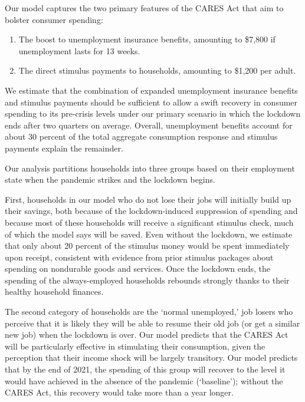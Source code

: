 \documentclass[titlepage,a4paper]{\econtex}
\begin{document}
Our model captures the two primary features of the CARES Act that aim to bolster consumer spending:
\begin{enumerate}
\item The boost to unemployment insurance benefits, amounting to \$7,800 if unemployment lasts for 13 weeks.
\item The direct stimulus payments to households, amounting to \$1,200 per adult.
\end{enumerate}

We estimate that the combination of expanded unemployment insurance benefits and stimulus payments should be sufficient to allow a swift recovery in consumer spending to its pre-crisis levels under our primary scenario in which the lockdown ends after two quarters on average.
Overall, unemployment benefits account for about 30 percent of the total aggregate consumption response and stimulus payments explain the remainder.

Our analysis partitions households into three groups based on their employment state when the pandemic strikes and the lockdown begins.

First, households in our model who do not lose their jobs will initially build up their savings, both because of the lockdown-induced suppression of spending and because most of these households will receive a significant stimulus check, much of which the model says will be saved.
Even without the lockdown, we estimate that only about 20 percent of the stimulus money would be spent immediately upon receipt, consistent with evidence from prior stimulus packages about spending on nondurable goods and services.
Once the lockdown ends, the spending of the always-employed households rebounds strongly thanks to their healthy household finances.%

The second category of households are the `normal unemployed,' job losers who perceive that it is likely they will be able to resume their old job (or get a similar new job) when the lockdown is over.
Our model predicts that the CARES Act will be particularly effective in stimulating their consumption, given the perception that their income shock will be largely transitory.  Our model predicts that by the end of 2021, the spending of this group will recover to the level it would have achieved in the absence of the pandemic (`baseline'); without the CARES Act, this recovery would take more than a year longer.
\end{document}
